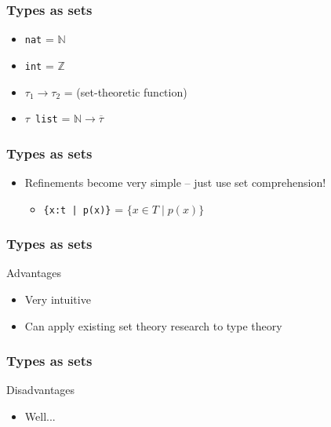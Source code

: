 \documentclass[usenames,dvipsnames]{beamer}
\begin{document}

\begin{frame}
  \frametitle{Types as sets}

  \begin{itemize}
    \item \texttt{nat} = $\mathbb{N}$
    \item \texttt{int} = $\mathbb{Z}$
    \item $\tau_1 \rightarrow \tau_2$ = (set-theoretic function)
    \item $\tau$\texttt{ list} = $\mathbb{N} \rightarrow \overline\tau$
  \end{itemize}
\end{frame}


\begin{frame}
  \frametitle{Types as sets}

  \begin{itemize}
    \item Refinements become very simple -- just use set comprehension!
    \begin{itemize}
      \item \texttt{\{x:t | p(x)\}} = $\{ x \in T \mid p(x) \}$
    \end{itemize}
  \end{itemize}
\end{frame}


\begin{frame}
  \frametitle{Types as sets}

  \begin{block}{Advantages}
    \begin{itemize}
      \item Very intuitive
      \item Can apply existing set theory research to type theory
    \end{itemize}
  \end{block}
\end{frame}


\begin{frame}
  \frametitle{Types as sets}

  \begin{block}{Disadvantages}
    \begin{itemize}
      \item Well...
    \end{itemize}
  \end{block}
\end{frame}
\end{document}
